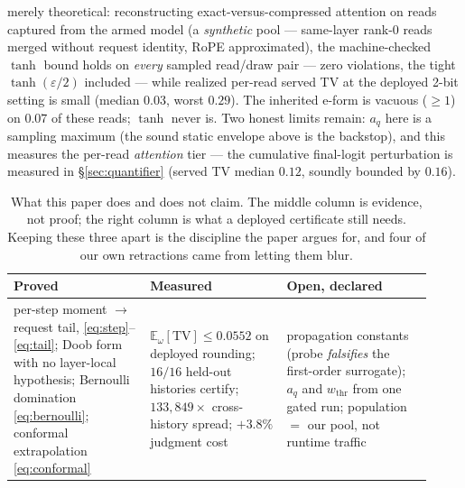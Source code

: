 \documentclass[11pt]{article}
\renewcommand{\_}{\WCorigunderscore\allowbreak}
\begin{document}
merely theoretical: reconstructing exact-versus-compressed attention on
reads captured from the armed model (a \emph{synthetic} pool ---
same-layer rank-0 reads merged without request identity, RoPE
approximated), the machine-checked $\tanh$ bound holds on \emph{every}
sampled read/draw pair --- zero violations, the tight
$\tanh(\varepsilon/2)$ included --- while realized per-read served TV at
the deployed 2-bit setting is small (median $0.03$, worst $0.29$). The
inherited e-form is vacuous ($\ge1$) on $0.07$ of these reads; $\tanh$
never is. Two honest limits remain: $a_q$ here is a sampling maximum
(the sound static envelope above is the backstop), and this measures
the per-read \emph{attention} tier --- the cumulative final-logit
perturbation is measured in \S\ref{sec:quantifier} (served TV median
$0.12$, soundly bounded by $0.16$).

\begin{table}[htbp]\centering\small
\setlength{\tabcolsep}{5pt}
\begin{tabular}{@{}p{0.30\linewidth}p{0.30\linewidth}p{0.32\linewidth}@{}}
\toprule
\textbf{Proved} & \textbf{Measured} & \textbf{Open, declared}\\
\midrule
per-step moment $\to$ request tail, \eqref{eq:step}--\eqref{eq:tail};
Doob form with no layer-local hypothesis;
Bernoulli domination \eqref{eq:bernoulli};
conformal extrapolation \eqref{eq:conformal}
&
$\mathbb{E}_\omega[\mathrm{TV}]\le0.0552$ on deployed rounding;
$16/16$ held-out histories certify;
$133{,}849\times$ cross-history spread;
$+3.8\%$ judgment cost
&
propagation constants (probe \emph{falsifies} the first-order
surrogate); $a_q$ and $w_{\mathrm{thr}}$ from one gated run;
population $=$ our pool, not runtime traffic\\
\bottomrule
\end{tabular}
\caption{What this paper does and does not claim. The middle column is
evidence, not proof; the right column is what a deployed certificate
still needs. Keeping these three apart is the discipline the paper argues
for, and four of our own retractions came from letting them blur.}
\label{tab:status}
\end{table}
\end{document}
